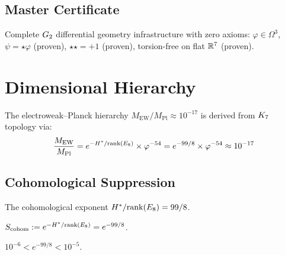 \section{Master Certificate}

\begin{theorem}\label{thm:geometry_cert}
    \leanok
    Complete $G_2$ differential geometry infrastructure with zero axioms:
    $\varphi \in \Omega^3$, $\psi = \star\varphi$ (proven), $\star\star = +1$ (proven),
    torsion-free on flat $\mathbb{R}^7$ (proven).
\end{theorem}


\chapter{Dimensional Hierarchy}\label{chap:hierarchy}

The electroweak--Planck hierarchy $M_{\mathrm{EW}}/M_{\mathrm{Pl}} \approx 10^{-17}$
is derived from $K_7$ topology via:
\[
    \frac{M_{\mathrm{EW}}}{M_{\mathrm{Pl}}} = e^{-H^*/\mathrm{rank}(E_8)} \times \varphi^{-54}
    = e^{-99/8} \times \varphi^{-54} \approx 10^{-17}
\]

\section{Cohomological Suppression}

\begin{definition}\label{def:cohom_ratio}
    \leanok
    The cohomological exponent $H^* / \mathrm{rank}(E_8) = 99/8$.
\end{definition}

\begin{definition}\label{def:cohom_suppression}
    \leanok
    $S_{\mathrm{cohom}} := e^{-H^*/\mathrm{rank}(E_8)} = e^{-99/8}$.
\end{definition}

\begin{theorem}\label{thm:cohom_magnitude}
    \leanok
    $10^{-6} < e^{-99/8} < 10^{-5}$.
\end{theorem}

